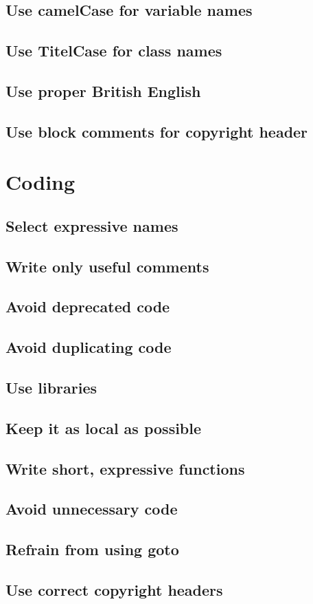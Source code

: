 \documentclass[a4paper,11pt,parskip=half+]{scrreprt}
\begin{document}
\section{Use camelCase for variable names}
\section{Use TitelCase for class names}
\section{Use proper British English}
\section{Use block comments for copyright header}


\chapter{Coding}
\section{Select expressive names}
\section{Write only useful comments}
\section{Avoid deprecated code}
\section{Avoid duplicating code}
\section{Use libraries}
\section{Keep it as local as possible}
\section{Write short, expressive functions}
\section{Avoid unnecessary code}
\section{Refrain from using goto}
\section{Use correct copyright headers}
\end{document}
